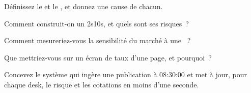 \begin{interviewq}\label{iq:m2:reading-a-macro-calendar-and-a-rates-screen:2}
Définissez le  et le , et donnez une cause de chacun.
\end{interviewq}

\begin{interviewq}\label{iq:m2:reading-a-macro-calendar-and-a-rates-screen:3}
Comment construit-on un  2s10s, et quels sont ses risques~?
\end{interviewq}

\begin{interviewq}\label{iq:m2:reading-a-macro-calendar-and-a-rates-screen:4}
Comment mesureriez-vous la sensibilité du marché à une ~?
\end{interviewq}

\begin{interviewq}\label{iq:m2:reading-a-macro-calendar-and-a-rates-screen:5}
Que mettriez-vous sur un écran de taux d'une page, et pourquoi~?
\end{interviewq}

\begin{interviewq}\label{iq:m2:reading-a-macro-calendar-and-a-rates-screen:6}
Concevez le système qui ingère une publication à 08:30:00 et met à jour, pour chaque desk, le risque et
les cotations en moins d'une seconde.
\end{interviewq}
